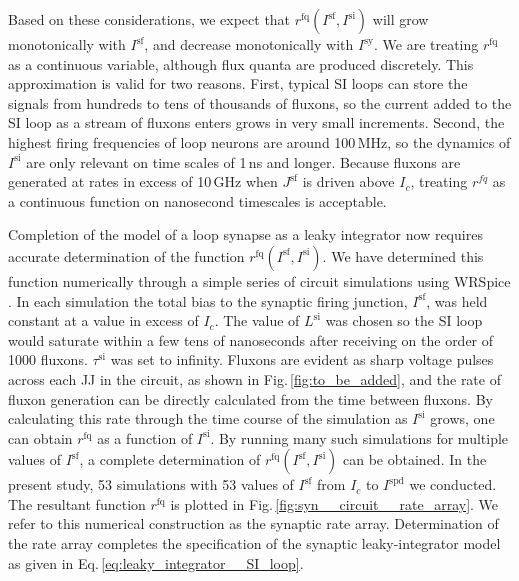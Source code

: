 \documentclass[twocolumn]{article}
\begin{document}
Based on these considerations, we expect that $r^{\mathrm{fq}}(I^{\mathrm{sf}},I^{\mathrm{si}})$ will grow monotonically with $I^{\mathrm{sf}}$, and decrease monotonically with $I^{\mathrm{sy}}$. We are treating $r^{\mathrm{fq}}$ as a continuous variable, although flux quanta are produced discretely. This approximation is valid for two reasons. First, typical SI loops can store the signals from hundreds to tens of thousands of fluxons, so the current added to the SI loop as a stream of fluxons enters grows in very small increments. Second, the highest firing frequencies of loop neurons are around 100\,MHz, so the dynamics of $I^{\mathrm{si}}$ are only relevant on time scales of 1\,ns and longer. Because fluxons are generated at rates in excess of 10\,GHz when $J^{\mathrm{sf}}$ is driven above $I_c$, treating $r^{fq}$ as a continuous function on nanosecond timescales is acceptable.

Completion of the model of a loop synapse as a leaky integrator now requires accurate determination of the function $r^{\mathrm{fq}}(I^{\mathrm{sf}},I^{\mathrm{si}})$. We have determined this function numerically through a simple series of circuit simulations using WRSpice \cite{wh1991}. In each simulation the total bias to the synaptic firing junction, $I^{\mathrm{sf}}$, was held constant at a value in excess of $I_c$. The value of $L^{\mathrm{si}}$ was chosen so the SI loop would saturate within a few tens of nanoseconds after receiving on the order of 1000 fluxons. $\tau^{\mathrm{si}}$ was set to infinity. Fluxons are evident as sharp voltage pulses across each JJ in the circuit, as shown in Fig.\,\ref{fig:to_be_added}, and the rate of fluxon generation can be directly calculated from the time between fluxons. By calculating this rate through the time course of the simulation as $I^{\mathrm{si}}$ grows, one can obtain $r^{\mathrm{fq}}$ as a function of $I^{\mathrm{si}}$. By running many such simulations for multiple values of $I^{\mathrm{sf}}$, a complete determination of $r^{\mathrm{fq}}(I^{\mathrm{sf}},I^{\mathrm{si}})$ can be obtained. In the present study, 53 simulations with 53 values of $I^{\mathrm{sf}}$ from $I_c$ to $I^{\mathrm{spd}}$ we conducted. The resultant function $r^{\mathrm{fq}}$ is plotted in Fig.\,\ref{fig:syn__circuit__rate_array}. We refer to this numerical construction as the synaptic rate array. Determination of the rate array completes the specification of the synaptic leaky-integrator model as given in Eq.\,\ref{eq:leaky_integrator__SI_loop}.
\end{document}

